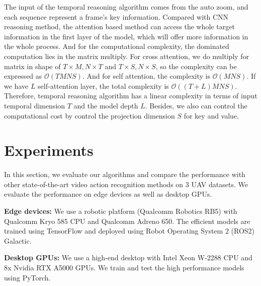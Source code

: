 \documentclass[letterpaper, 10 pt, conference]{ieeeconf}
\begin{document}
The input of the temporal reasoning algorithm comes from the auto zoom, and each sequence represent a frame's key information. Compared with CNN reasoning method, the attention based method can access the whole target information in the first layer of the model, which will offer more information in the whole process. And for the computational complexity, the dominated computation lies in the matrix multiply. For cross attention, we do multiply for matrix in shape of $T\times M, N\times T$ and $ T\times S, N\times S$, so the complexity can be expressed as $\mathcal{O}(TMNS)$. And for self attention, the complexity is $\mathcal{O}(MNS)$. If we have $L$ self-attention layer, the total complexity is $\mathcal{O}((T+L)MNS)$. Therefore, temporal reasoning algorithm has a linear complexity in terms of input temporal dimension $T$ and the model depth $L$. Besides, we also can control the computational cost by control the projection dimension $S$ for key and value.


 \section{Experiments}
\label{sec: experiment}



In this section, we evaluate our algorithms and compare the performance with other state-of-the-art video action recognition methods on 3 UAV datasets. We evaluate the performance on edge devices as well as desktop GPUs.

\noindent  \textbf{Edge devices:} We use a robotic platform (Qualcomm Robotics RB5) with Qualcomm Kryo 585 CPU and Qualcomm Adreno 650. The efficient models are trained using TensorFlow and deployed using Robot Operating System 2 (ROS2) Galactic.

\noindent  \textbf{Desktop GPUs:} We use a high-end desktop with Intel Xeon W-2288 CPU and 8x Nvidia RTX A5000 GPUs. We train and test the high performance models using PyTorch.
\end{document}
